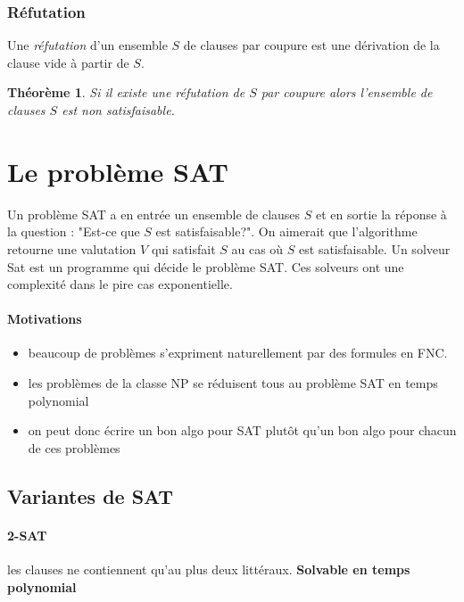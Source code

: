 \documentclass[a4paper]{article}
\newtheorem{theorem}{Théorème}[section]
\begin{document}
  \subsubsection{Réfutation}
  Une \textit{réfutation} d'un ensemble $S$ de clauses par coupure est une dérivation
  de la clause vide à partir de $S$.

  \begin{theorem}
  Si il existe une réfutation de $S$ par coupure alors l'ensemble de clauses $S$
  est non satisfaisable.
  \end{theorem}


\section{Le problème SAT}

  Un problème SAT a en entrée un ensemble de clauses $S$ et en sortie la réponse à 
  la question : "Est-ce que $S$ est satisfaisable?". On aimerait que l'algorithme
  retourne une valutation $V$ qui satisfait $S$ au cas où $S$ est satisfaisable.
  Un solveur Sat est un programme qui décide le  problème SAT. Ces solveurs
  ont une complexité dans le pire cas exponentielle.

  \paragraph{Motivations}
  \begin{itemize}
    \item beaucoup de problèmes s'expriment naturellement par des formules en FNC.
    \item les problèmes de la classe NP se réduisent tous au problème SAT en temps polynomial
    \item on peut donc écrire un bon algo pour SAT plutôt qu'un bon algo pour chacun de ces problèmes
  \end{itemize}

  \subsection{Variantes de SAT}

    \paragraph{2-SAT} les clauses ne contiennent qu'au plus deux littéraux. \textbf{Solvable en temps polynomial}
    
\end{document}
